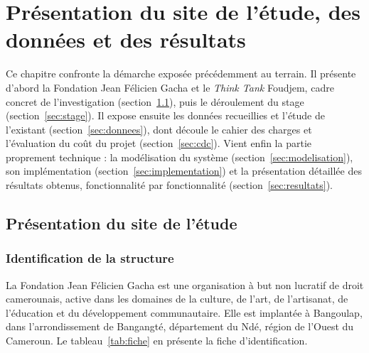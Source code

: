 \chapter{Présentation du site de l'étude, des données et des résultats}
\label{chap:terrain}

\introchap

Ce chapitre confronte la démarche exposée précédemment au terrain. Il présente
d'abord la Fondation Jean Félicien Gacha et le \emph{Think Tank} Foudjem, cadre
concret de l'investigation (section~\ref{sec:site}), puis le déroulement du
stage (section~\ref{sec:stage}). Il expose ensuite les données recueillies et
l'étude de l'existant (section~\ref{sec:donnees}), dont découle le cahier des
charges et l'évaluation du coût du projet (section~\ref{sec:cdc}). Vient enfin
la partie proprement technique : la modélisation du système
(section~\ref{sec:modelisation}), son implémentation
(section~\ref{sec:implementation}) et la présentation détaillée des résultats
obtenus, fonctionnalité par fonctionnalité (section~\ref{sec:resultats}).

\section{Présentation du site de l'étude}
\label{sec:site}

\subsection{Identification de la structure}

La Fondation Jean Félicien Gacha est une organisation à but non lucratif de
droit camerounais, active dans les domaines de la culture, de l'art, de
l'artisanat, de l'éducation et du développement communautaire. Elle est
implantée à Bangoulap, dans l'arrondissement de Bangangté, département du Ndé,
région de l'Ouest du Cameroun. Le tableau~\ref{tab:fiche} en présente la fiche
d'identification.

